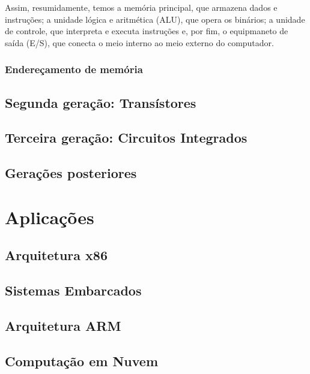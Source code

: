 \documentclass{article}
\begin{document}
Assim, resumidamente, temos a memória principal, que armazena dados e
instruções; a unidade lógica e aritmética (ALU), que opera os binários; a
unidade de controle, que interpreta e executa instruções e, por fim, o
equipmaneto de saída (E/S), que conecta o meio interno ao meio externo do
computador.

\subsubsection{Endereçamento de memória}

\subsection{Segunda geração: Transístores}
\subsection{Terceira geração: Circuitos Integrados}
\subsection{Gerações posteriores}

\section{Aplicações} 
\subsection{Arquitetura x86} 
\subsection{Sistemas Embarcados}
\subsection{Arquitetura ARM} 
\subsection{Computação em Nuvem}
\end{document}
